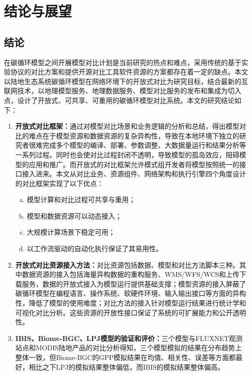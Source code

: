 \chapter{结论与展望}
\section{结论}
在碳循环模型之间开展模型对比计划是当前研究的热点和难点，采用传统的基于实验协议的对比方案和提供开源对比工具软件资源的方案都存在着一定的缺点。本文以陆地生态系统碳循环模型在网络环境下的开放式对比为研究目标，结合最新的互联网技术，以地理模型服务、地理数据服务、模型对比服务的发布和集成为切入点，设计了开放式、可共享、可重用的碳循环模型对比系统。本文的研究结论如下：
\renewcommand{\labelenumii}{\theenumii}
\renewcommand{\theenumii}{\theenumi.\arabic{enumii}.}
\begin{enumerate}[(1)]
    \item \textbf{开放式对比框架：}通过对模型对比场景和业务逻辑的分析和总结，得出模型对比的难点在于模型资源和数据资源的复杂异构性，导致在本地环境下独立的研究者很难完成多个模型的编译、部署、参数调整、大数据量运行和结果分析等一系列过程。同时也会使对比过程封闭不透明，导致模型的孤岛效应，阻碍模型的应用和推广。而开放式的对比框架允许模式组开发者将模型按照统一的接口接入进来。本文从对比业务、资源组件、网络架构和执行引擎四个角度设计的对比框架实现了以下优点：
        \begin{enumerate}[a)]
            \item 模型计算和对比过程可共享与重用；
            \item 模型和数据资源可以动态接入；
            \item 大规模计算场景下稳定可用；
            \item 以工作流驱动的自动化执行保证了其易用性。
        \end{enumerate}
    \item \textbf{开放式对比资源接入方法：}对比资源包括数据、模型和对比方法脚本三种。其中数据资源的接入包括海量异构数据的重构服务、WMS/WFS/WCS和上传下载服务，数据的开放式接入为模型运行提供基础支撑；模型资源的接入屏蔽了碳循环模型在编程语言、操作系统、软硬件环境、输入输出接口等方面的异构性，降低了模型的使用难度；对比方法的接入针对模型运行结果进行统计学和可视化对比分析。这些资源的开放性接口保证了系统的可扩展能力和公开透明性。
    \item \textbf{IBIS、Biome-BGC、LPJ模型的验证和评价：}三个模型与FLUXNET观测站点和MODIS陆地产品的对比分析得知，三个模型模拟的结果在分布趋势上整体一致，但Biome-BGC的GPP模拟结果在均值、相关性、误差等方面都最好，相比之下LPJ的模拟结果整体偏低，而IBIS的模拟结果整体偏高。
\end{enumerate}

